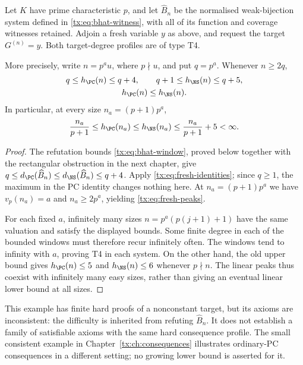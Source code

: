 \begin{corollary}\label{tx:cor:fresh-peaks}
Let $K$ have prime characteristic $p$, and let $\widehat B_n$ be the
normalised weak-bijection system defined in
\eqref{tx:eq:bhat-witness}, with all of its function and coverage witnesses
retained. Adjoin a fresh variable $y$ as above, and request the target
$G^{(n)}=y$. Both target-degree profiles are of type T4.

More precisely, write $n=p^a u$, where $p\nmid u$, and put $q=p^a$.
Whenever $n\ge2q$,
\[
 \begin{gathered}
 q\le h_{\PC}(n)\le q+4,\qquad
 q+1\le h_{\NS}(n)\le q+5,\\
                         h_{\PC}(n)\le h_{\NS}(n).
 \end{gathered}
\]
In particular, at every size $n_a=(p+1)p^a$,
\begin{equation}\label{tx:eq:fresh-peaks}
 \frac{n_a}{p+1}\le h_{\PC}(n_a)\le h_{\NS}(n_a)
                              \le\frac{n_a}{p+1}+5<\infty.
\end{equation}
\end{corollary}
\begin{proof}
The refutation bounds \eqref{tx:eq:bhat-window}, proved below together with the rectangular obstruction in the next
chapter, give
$q\le d_{\PC}(\widehat B_n)\le d_{\NS}(\widehat B_n)\le q+4$.
Apply \eqref{tx:eq:fresh-identities}; since $q\ge1$, the maximum in the
PC identity changes nothing here. At $n_a=(p+1)p^a$ we have
$v_p(n_a)=a$ and $n_a\ge2p^a$, yielding \eqref{tx:eq:fresh-peaks}.

For each fixed $a$, infinitely many sizes
$n=p^a(p(j+1)+1)$ have the same valuation and satisfy the displayed
bounds. Some finite degree in each of the bounded windows must
therefore recur infinitely often. The windows tend to infinity with
$a$, proving T4 in each system. On the other hand, the old upper
bound gives $h_{\PC}(n)\le5$ and $h_{\NS}(n)\le6$ whenever
$p\nmid n$. The linear peaks thus coexist with infinitely many easy
sizes, rather than giving an eventual linear lower bound at all sizes.
\end{proof}

This example has finite hard proofs of a nonconstant target, but its
axioms are inconsistent: the difficulty is inherited from refuting
$\widehat B_n$. It does not establish a family of satisfiable axioms
with the same hard consequence profile. The small consistent example
in Chapter~\ref{tx:ch:consequences} illustrates ordinary-PC consequences in
a different setting; no growing lower bound is asserted for it.


